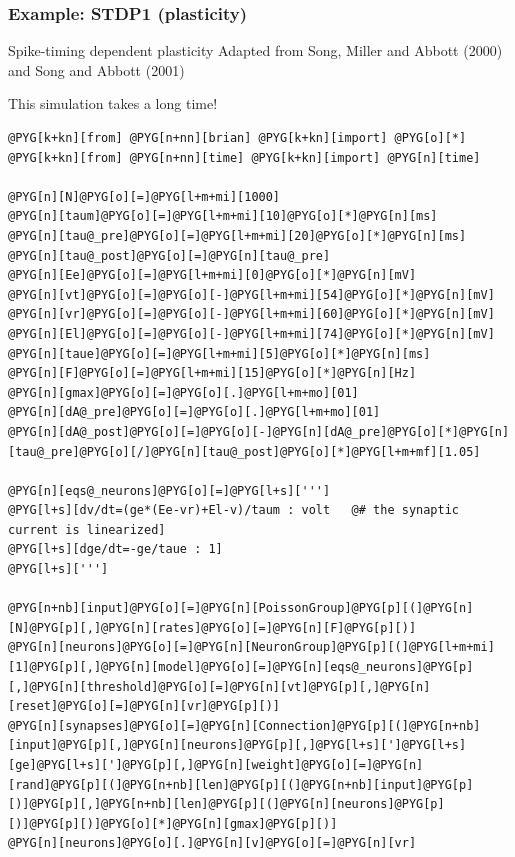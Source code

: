 \documentclass[letterpaper,10pt,english]{manual}
\begin{document}
\resetcurrentobjects
\hypertarget{--doc-examples-plasticity_STDP1}{}

\hypertarget{index-77}{}\subsubsection{Example: STDP1 (plasticity)}

Spike-timing dependent plasticity
Adapted from Song, Miller and Abbott (2000) and Song and Abbott (2001)

This simulation takes a long time!

\begin{Verbatim}[commandchars=@\[\]]
@PYG[k+kn][from] @PYG[n+nn][brian] @PYG[k+kn][import] @PYG[o][*]
@PYG[k+kn][from] @PYG[n+nn][time] @PYG[k+kn][import] @PYG[n][time]

@PYG[n][N]@PYG[o][=]@PYG[l+m+mi][1000]
@PYG[n][taum]@PYG[o][=]@PYG[l+m+mi][10]@PYG[o][*]@PYG[n][ms]
@PYG[n][tau@_pre]@PYG[o][=]@PYG[l+m+mi][20]@PYG[o][*]@PYG[n][ms]
@PYG[n][tau@_post]@PYG[o][=]@PYG[n][tau@_pre]
@PYG[n][Ee]@PYG[o][=]@PYG[l+m+mi][0]@PYG[o][*]@PYG[n][mV]
@PYG[n][vt]@PYG[o][=]@PYG[o][-]@PYG[l+m+mi][54]@PYG[o][*]@PYG[n][mV]
@PYG[n][vr]@PYG[o][=]@PYG[o][-]@PYG[l+m+mi][60]@PYG[o][*]@PYG[n][mV]
@PYG[n][El]@PYG[o][=]@PYG[o][-]@PYG[l+m+mi][74]@PYG[o][*]@PYG[n][mV]
@PYG[n][taue]@PYG[o][=]@PYG[l+m+mi][5]@PYG[o][*]@PYG[n][ms]
@PYG[n][F]@PYG[o][=]@PYG[l+m+mi][15]@PYG[o][*]@PYG[n][Hz]
@PYG[n][gmax]@PYG[o][=]@PYG[o][.]@PYG[l+m+mo][01]
@PYG[n][dA@_pre]@PYG[o][=]@PYG[o][.]@PYG[l+m+mo][01]
@PYG[n][dA@_post]@PYG[o][=]@PYG[o][-]@PYG[n][dA@_pre]@PYG[o][*]@PYG[n][tau@_pre]@PYG[o][/]@PYG[n][tau@_post]@PYG[o][*]@PYG[l+m+mf][1.05]

@PYG[n][eqs@_neurons]@PYG[o][=]@PYG[l+s][''']
@PYG[l+s][dv/dt=(ge*(Ee-vr)+El-v)/taum : volt   @# the synaptic current is linearized]
@PYG[l+s][dge/dt=-ge/taue : 1]
@PYG[l+s][''']

@PYG[n+nb][input]@PYG[o][=]@PYG[n][PoissonGroup]@PYG[p][(]@PYG[n][N]@PYG[p][,]@PYG[n][rates]@PYG[o][=]@PYG[n][F]@PYG[p][)]
@PYG[n][neurons]@PYG[o][=]@PYG[n][NeuronGroup]@PYG[p][(]@PYG[l+m+mi][1]@PYG[p][,]@PYG[n][model]@PYG[o][=]@PYG[n][eqs@_neurons]@PYG[p][,]@PYG[n][threshold]@PYG[o][=]@PYG[n][vt]@PYG[p][,]@PYG[n][reset]@PYG[o][=]@PYG[n][vr]@PYG[p][)]
@PYG[n][synapses]@PYG[o][=]@PYG[n][Connection]@PYG[p][(]@PYG[n+nb][input]@PYG[p][,]@PYG[n][neurons]@PYG[p][,]@PYG[l+s][']@PYG[l+s][ge]@PYG[l+s][']@PYG[p][,]@PYG[n][weight]@PYG[o][=]@PYG[n][rand]@PYG[p][(]@PYG[n+nb][len]@PYG[p][(]@PYG[n+nb][input]@PYG[p][)]@PYG[p][,]@PYG[n+nb][len]@PYG[p][(]@PYG[n][neurons]@PYG[p][)]@PYG[p][)]@PYG[o][*]@PYG[n][gmax]@PYG[p][)]
@PYG[n][neurons]@PYG[o][.]@PYG[n][v]@PYG[o][=]@PYG[n][vr]


\end{Verbatim}
\end{document}
